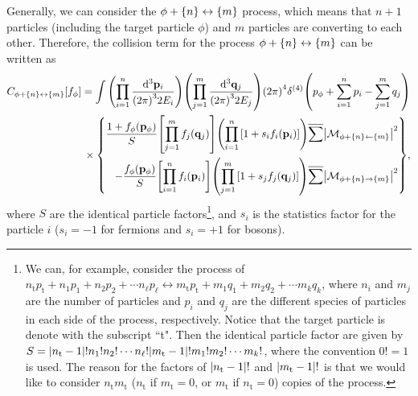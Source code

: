 \documentclass{article}
\begin{document}
        Generally, we can consider the $\phi + \qty{n} \leftrightarrow \qty{m}$ process, which means that $n + 1$ particles (including the target particle $\phi$) and $m$ particles are converting to each other.
        Therefore, the collision term for the process $\phi + \qty{n} \leftrightarrow \qty{m}$ can be written as \cite{Dodelson:2020MC}
        \begin{equation}
            \begin{aligned}
                C_{\phi + \qty{n} \leftrightarrow \qty{m}}[f_\phi] = \int \qty(\prod_{i=1}^n \frac{\dd[3]{\vb{p}_i}}{\qty(2 \pi)^3 2 E_i}) \qty(\prod_{j=1}^m \frac{\dd[3]{\vb{q}_j}}{\qty(2 \pi)^3 2 E_j}) \qty(2 \pi)^4 \delta^{(4)}\qty(p_\phi + \sum_{i=1}^n p_i - \sum_{j=1}^m q_j) \\
                {} \times \qty{ \begin{aligned}
                    \frac{1 + f_\phi(\vb{p}_\phi)}{S} \qty[\prod_{j=1}^m f_j(\vb{q}_j)] \qty(\prod_{i=1}^n \qty[1 + s_i f_i(\vb{p}_i)]) \overline{\sum} \abs{\mathcal{M}_{\phi + \qty{n} \leftarrow \qty{m}}}^2 \\
                    - \frac{f_\phi(\vb{p}_\phi)}{S} \qty[\prod_{i=1}^n f_i(\vb{p}_i)] \qty(\prod_{j=1}^m \qty[1 + s_j f_j(\vb{q}_j)]) \overline{\sum} \abs{\mathcal{M}_{\phi + \qty{n} \to \qty{m}}}^2
                \end{aligned} },
            \end{aligned}
            \label{eq:collision-term}
        \end{equation}
        where $S$ are the identical particle factors\footnote{
            We can, for example, consider the process of $n_\mathrm{t} p_\mathrm{t} + n_1 p_1 + n_2 p_2 + \cdots n_\ell p_\ell \leftrightarrow m_\mathrm{t} p_\mathrm{t} + m_1 q_1 + m_2 q_2 + \cdots m_k q_k$, where $n_i$ and $m_j$ are the number of particles and $p_i$ and $q_j$ are the different species of particles in each side of the process, respectively.
            Notice that the target particle is denote with the subscript ``t".
            Then the identical particle factor are given by $S = \abs{n_\mathrm{t} - 1}! n_1! n_2! \cdots n_\ell! \abs{m_\mathrm{t} - 1}! m_1! m_2! \cdots m_k!$, where the convention $0! = 1$ is used.
            The reason for the factors of $\abs{n_\mathrm{t} - 1}!$ and $\abs{m_\mathrm{t} - 1}!$ is that we would like to consider $n_\mathrm{t} m_\mathrm{t}$ ($n_\mathrm{t}$ if $m_\mathrm{t} = 0$, or $m_\mathrm{t}$ if $n_\mathrm{t} = 0$) copies of the process.
        }, and $s_i$ is the statistics factor for the particle $i$ ($s_i = -1$ for fermions and $s_i = +1$ for bosons).
\end{document}

